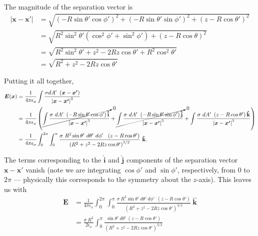 \documentclass{article}
\numberwithin{equation}{section}
\newcommand{\ihat}{\mathbf{\hat{i}}}
\newcommand{\jhat}{\mathbf{\hat{j}}}
\newcommand{\khat}{\mathbf{\hat{k}}}
\begin{document}
The magnitude of the separation vector is
\begin{align*}
    \left| \bm{x} - \bm{x'} \right| &= \sqrt{\left( -R\sin{\theta'}\cos{\phi'} \right)^2 + \left( -R\sin{\theta'}\sin{\phi'} \right)^2 + \left( z - R\cos{\theta'} \right)^2} \\
    &= \sqrt{R^2 \sin^2{\theta'} \left( \cos^2{\phi'} + \sin^2{\phi'} \right) + \left( z - R\cos{\theta} \right)^2} \\
    &= \sqrt{R^2 \sin^2{\theta'} + z^2 - 2Rz\cos{\theta'} + R^2 \cos^2{\theta'}} \\
    &= \sqrt{R^2 + z^2 - 2Rz\cos{\theta'}}
\end{align*}

Putting it all together,
\begin{align*}
    \bm{E}(\bm{x}) &= \frac{1}{4\pi\epsilon_o} \int \frac{\sigma dA'\ \left( \bm{x} - \bm{x'} \right)}{\left| \bm{x} - \bm{x'} \right|^3} \\
    &= \frac{1}{4\pi\epsilon_o} \left( \cancelto{0}{\int \frac{\sigma\ dA'\ \left( -R\sin{\theta'}\cos{\phi'} \right) \ihat}{\left| \bm{x} - \bm{x'} \right|^3}} + \cancelto{0}{\int \frac{\sigma\ dA'\ \left( -R\sin{\theta'}\sin{\phi'} \right) \jhat}{\left| \bm{x} - \bm{x'} \right|^3}} + \int \frac{\sigma\ dA'\ \left( z - R\cos{\theta'} \right) \khat}{\left| \bm{x} - \bm{x'} \right|^3} \right) \\
    &= \frac{1}{4\pi\epsilon_o} \int_0^{2\pi} \int_{0}^{\pi} \frac{\sigma\ R^2 \sin{\theta'}\ d\theta'\ d\phi'\ \ \left( z - R\cos{\theta'} \right)}{\left( R^2 + z^2 - 2Rz \cos{\theta'} \right)^{3/2}}\ \khat.
\end{align*}

The terms corresponding to the $\ihat$ and $\jhat$ components of the separation vector $\bm{x} - \bm{x'}$ vanish (note we are integrating $\cos{\phi'}$ and $\sin{\phi'}$, respectively, from $0$ to $2\pi$ --- physically this corresponds to the symmetry about the $z$-axis). This leaves us with
\begin{align*}
    \bm{E} &= \frac{1}{4\pi\epsilon_o} \int_0^{2\pi} \int_{0}^{\pi} \frac{\sigma\ R^2 \sin{\theta'}\ d\theta'\ d\phi'\ \ \left( z - R\cos{\theta'} \right)}{\left( R^2 + z^2 - 2Rz \cos{\theta'} \right)^{3/2}}\ \khat \\
    &= \frac{\sigma\ R^2}{2\epsilon_o} \int_{0}^{\pi} \frac{\sin{\theta'}\ d\theta'\ \left( z - R \cos{\theta'} \right)}{\left( R^2 + z^2 - 2Rz\cos{\theta'} \right)^{3/2}}
\end{align*}
\end{document}
